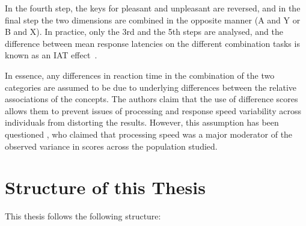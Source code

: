 In the fourth step, the keys for pleasant and unpleasant are reversed, and in the final step the two dimensions are combined in the opposite manner (A and Y or B and X). In practice, only the 3rd and the 5th steps are analysed, and the difference between mean response latencies on the different combination tasks is known as an IAT effect~\cite{Greenwald1998}. 

In essence, any differences in reaction time in the combination of the two categories are assumed to be due to underlying differences between the relative associations of the concepts. The authors claim that the use of difference scores allows them to prevent issues of processing and response speed variability across individuals from distorting the results. However, this assumption has been questioned \cite{Blanton2006}, who claimed that processing speed was a major moderator of the observed variance in scores across the population studied.  

\section{Structure of this Thesis}
\label{sec:struct-this-thes}



This thesis follows the following structure:

